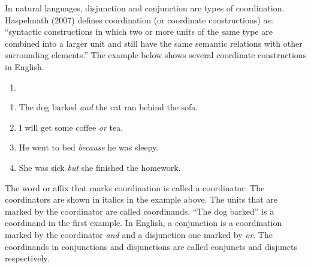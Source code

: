 \documentclass[oneside]{report}
\theoremstyle{definition}
\theoremstyle{definition}
\theoremstyle{definition}
\theoremstyle{remark}
\begin{document}
In natural languages, disjunction and conjunction are types of
coordination. Haspelmath (2007) defines coordination (or coordinate
constructions) as: ``syntactic constructions in which two or more units
of the same type are combined into a larger unit and still have the same
semantic relations with other surrounding elements.'' The example below
shows several coordinate constructions in English.
\begin{enumerate}
\def\labelenumi{(\arabic{enumi})}
\item
\end{enumerate}
\begin{enumerate}
\def\labelenumi{\alph{enumi}.}
\tightlist
\item
  The dog barked \emph{and} the cat ran behind the sofa.
\item
  I will get some coffee \emph{or} tea.
\item
  He went to bed \emph{because} he was sleepy.
\item
  She was sick \emph{but} she finished the homework.
\end{enumerate}
The word or affix that marks coordination is called a coordinator. The
coordinators are shown in italics in the example above. The units that
are marked by the coordinator are called coordinands. ``The dog barked''
is a coordinand in the first example. In English, a conjunction is a
coordination marked by the coordinator \emph{and} and a disjunction one
marked by \emph{or}. The coordinands in conjunctions and disjunctions
are called conjuncts and disjuncts respectively.
\end{document}
